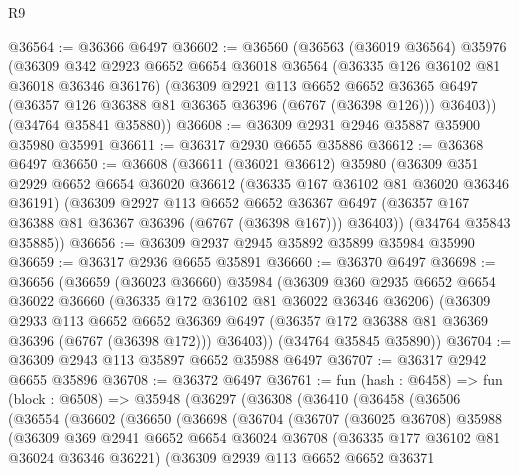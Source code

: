 \begin{lexlean}{R9}
\begin{coremodule}
@36564 := @36366 @6497
@36602 := @36560
    (@36563
      (@36019 @36564)
      @35976
      (@36309
        @342
        @2923
        @6652
        @6654
        @36018
        @36564
        (@36335 @126 @36102 @81 @36018 @36346 @36176)
        (@36309
          @2921
          @113
          @6652
          @6652
          @36365
          @6497
          (@36357 @126 @36388 @81 @36365 @36396 (@6767 (@36398 @126)))
          @36403))
      (@34764 @35841 @35880))
@36608 := @36309 @2931 @2946 @35887 @35900 @35980 @35991
@36611 := @36317 @2930 @6655 @35886
@36612 := @36368 @6497
@36650 := @36608
    (@36611
      (@36021 @36612)
      @35980
      (@36309
        @351
        @2929
        @6652
        @6654
        @36020
        @36612
        (@36335 @167 @36102 @81 @36020 @36346 @36191)
        (@36309
          @2927
          @113
          @6652
          @6652
          @36367
          @6497
          (@36357 @167 @36388 @81 @36367 @36396 (@6767 (@36398 @167)))
          @36403))
      (@34764 @35843 @35885))
@36656 := @36309 @2937 @2945 @35892 @35899 @35984 @35990
@36659 := @36317 @2936 @6655 @35891
@36660 := @36370 @6497
@36698 := @36656
    (@36659
      (@36023 @36660)
      @35984
      (@36309
        @360
        @2935
        @6652
        @6654
        @36022
        @36660
        (@36335 @172 @36102 @81 @36022 @36346 @36206)
        (@36309
          @2933
          @113
          @6652
          @6652
          @36369
          @6497
          (@36357 @172 @36388 @81 @36369 @36396 (@6767 (@36398 @172)))
          @36403))
      (@34764 @35845 @35890))
@36704 := @36309 @2943 @113 @35897 @6652 @35988 @6497
@36707 := @36317 @2942 @6655 @35896
@36708 := @36372 @6497
@36761 := fun (hash : @6458) =>
  fun (block : @6508) =>
  @35948
    (@36297
      (@36308
        (@36410
          (@36458
            (@36506
              (@36554
                (@36602
                  (@36650
                    (@36698
                      (@36704
                        (@36707
                          (@36025 @36708)
                          @35988
                          (@36309
                            @369
                            @2941
                            @6652
                            @6654
                            @36024
                            @36708
                            (@36335 @177 @36102 @81 @36024 @36346 @36221)
                            (@36309
                              @2939
                              @113
                              @6652
                              @6652
                              @36371

\end{coremodule}
\end{lexlean}
